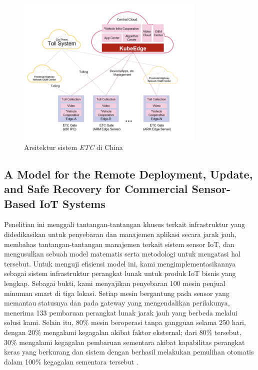 \begin{figure}[h]
  \includegraphics[width=0.8\textwidth]{resources/chapter-2/arsitektur-china-highways.jpg}
  \caption{Arsitektur sistem \textit{ETC} di China \parencite{penelitianterkait1}}
  \label{fig:architecture-china-highways}
\end{figure}

\subsection{A Model for the Remote Deployment, Update, and Safe Recovery for Commercial Sensor-Based IoT Systems}
Penelitian ini menggali tantangan-tantangan khusus terkait infrastruktur yang didedikasikan untuk penyebaran dan manajemen aplikasi secara jarak jauh, membahas tantangan-tantangan manajemen terkait sistem sensor IoT, dan mengusulkan sebuah model matematis serta metodologi untuk mengatasi hal tersebut. Untuk menguji efisiensi model ini, kami mengimplementasikannya sebagai sistem infrastruktur perangkat lunak untuk produk IoT bisnis yang lengkap. Sebagai bukti, kami menyajikan penyebaran 100 mesin penjual minuman smart di tiga lokasi. Setiap mesin bergantung pada sensor yang memantau statusnya dan pada gateway yang mengendalikan perilakunya, menerima 133 pembaruan perangkat lunak jarak jauh yang berbeda melalui solusi kami. Selain itu, 80\% mesin beroperasi tanpa gangguan selama 250 hari, dengan 20\% mengalami kegagalan akibat faktor eksternal; dari 80\% tersebut, 30\% mengalami kegagalan pembaruan sementara akibat kapabilitas perangkat keras yang berkurang dan sistem dengan berhasil melakukan pemulihan otomatis dalam 100\% kegagalan sementara tersebut \parencite{RemoteDeployment}.

